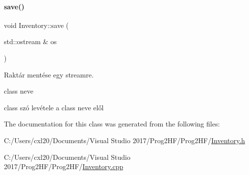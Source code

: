 \mbox{\label{class_inventory_a243a3e96705999b3cf556e9626a96525}} 
\paragraph{\texorpdfstring{save()}{save()}}
{\footnotesize\ttfamily void Inventory\+::save (\begin{DoxyParamCaption}\item[{std\+::ostream \&}]{os }\end{DoxyParamCaption})}



Raktár mentése egy streamre. 

class neve

class szó levétele a class neve elől 

The documentation for this class was generated from the following files\+:\begin{DoxyCompactItemize}
\item 
C\+:/\+Users/cxl20/\+Documents/\+Visual Studio 2017/\+Prog2\+H\+F/\+Prog2\+H\+F/\mbox{\hyperlink{_inventory_8h}{Inventory.\+h}}\item 
C\+:/\+Users/cxl20/\+Documents/\+Visual Studio 2017/\+Prog2\+H\+F/\+Prog2\+H\+F/\mbox{\hyperlink{_inventory_8cpp}{Inventory.\+cpp}}\end{DoxyCompactItemize}

